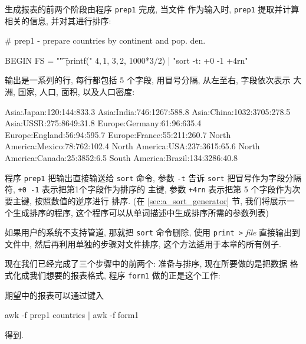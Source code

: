 生成报表的前两个阶段由程序 \verb'prep1' 完成, 当文件 
作为输入时, \verb'prep1' 提取并计算相关的信息, 并对其进行排序:
\begin{awkcode}
    # prep1 - prepare countries by continent and pop. den.

    BEGIN { FS = "\t" }
          { printf("%
                $4, $1, $3, $2, 1000*$3/$2) | "sort -t: +0 -1 +4rn"
          }
\end{awkcode}
输出是一系列的行, 每行都包括 5 个字段, 用冒号分隔, 从左至右, 字段依次表示
大洲, 国家, 人口, 面积, 以及人口密度:
\begin{awkcode}
    Asia:Japan:120:144:833.3
    Asia:India:746:1267:588.8
    Asia:China:1032:3705:278.5
    Asia:USSR:275:8649:31.8
    Europe:Germany:61:96:635.4
    Europe:England:56:94:595.7
    Europe:France:55:211:260.7
    North America:Mexico:78:762:102.4
    North America:USA:237:3615:65.6
    North America:Canada:25:3852:6.5
    South America:Brazil:134:3286:40.8
\end{awkcode}
程序 \verb'prep1' 把输出直接输送给 \verb'sort' 命令, 参数 \verb'-t' 告诉
\verb'sort' 把冒号作为字段分隔符, \verb'+0 -1' 表示把第1个字段作为排序的
主键, 参数 \verb'+4rn' 表示把第 5 个字段作为次要主键, 按照数值的逆序进行
排序. (在 \ref{sec:a_sort_generator} 节, 我们将展示一个生成排序的程序,
这个程序可以从单词描述中生成排序所需的参数列表)

如果用户的系统不支持管道, 那就把 \verb'sort' 命令删除, 使用 \verb'print >'
\textit{file} 直接输出到文件中, 然后再利用单独的步骤对文件排序,
这个方法适用于本章的所有例子.

现在我们已经完成了三个步骤中的前两个: 准备与排序, 现在所要做的是把数据
格式化成我们想要的报表格式, 程序 \verb'form1' 做的正是这个工作:
期望中的报表可以通过键入
\begin{awkcode}
    awk -f prep1 countries | awk -f form1
\end{awkcode}
得到.

